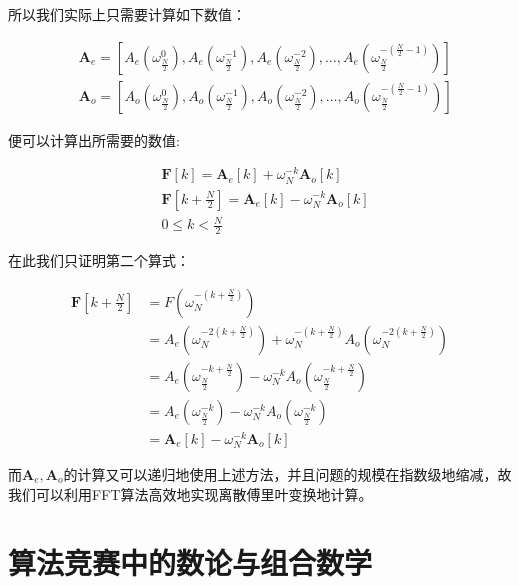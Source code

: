 \documentclass[UTF8]{book}
\begin{document}
所以我们实际上只需要计算如下数值：
\begin{large}
    \begin{equation}
        \begin{aligned}
            &\mathbf{A}_e=\left [ A_{e}(\omega_{\frac{N}{2}}^{0}),A_{e}(\omega_{\frac{N}{2}}^{-1}),A_{e}(\omega_{\frac{N}{2}}^{-2}),\dots ,A_{e}(\omega_{\frac{N}{2}}^{-(\frac{N}{2}-1)}) \right ] \\
            &\mathbf{A}_o=\left [ A_{o}(\omega_{\frac{N}{2}}^{0}),A_{o}(\omega_{\frac{N}{2}}^{-1}),A_{o}(\omega_{\frac{N}{2}}^{-2}),\dots ,A_{o}(\omega_{\frac{N}{2}}^{-(\frac{N}{2}-1)}) \right ]
            \nonumber
        \end{aligned}
    \end{equation}
\end{large}
便可以计算出所需要的数值:
\begin{large}
    \begin{equation}
        \begin{aligned}
            &\mathbf{F}\left [ k \right ]=\mathbf{A}_e\left [ k \right ]+\omega_N^{-k}\mathbf{A}_o\left [ k \right ] \\
            &\mathbf{F}\left [ k+\frac{N}{2} \right ]=\mathbf{A}_e\left [ k \right ]-\omega_N^{-k}\mathbf{A}_o\left [ k \right ] \\
            &0 \le k < \frac{N}{2}
            \nonumber
        \end{aligned}
    \end{equation}
\end{large}
在此我们只证明第二个算式：
\begin{large}
    \begin{equation}
        \begin{aligned}
            \mathbf{F}\left [ k+\frac{N}{2} \right ] &= F(\omega_N^{-(k+\frac{N}{2})}) \\
            &= A_e(\omega_N^{-2(k+\frac{N}{2})})+\omega_N^{-(k+\frac{N}{2})}A_o(\omega_N^{-2(k+\frac{N}{2})}) \\
            &= A_e(\omega_{\frac{N}{2}}^{-k+\frac{N}{2}})-\omega_N^{-k}A_o(\omega_{\frac{N}{2}}^{-k+\frac{N}{2}}) \\
            &= A_e(\omega_{\frac{N}{2}}^{-k})-\omega_N^{-k}A_o(\omega_{\frac{N}{2}}^{-k}) \\
            &= \mathbf{A}_e\left [ k \right ]-\omega_N^{-k}\mathbf{A}_o\left [ k \right ]
            \nonumber
        \end{aligned}
    \end{equation}
\end{large}
而$\mathbf{A}_e, \mathbf{A}_o$的计算又可以递归地使用上述方法，并且问题的规模在指数级地缩减，故我们可以利用FFT算法高效地实现离散傅里叶变换地计算。

\section{算法竞赛中的数论与组合数学}
\end{document}
